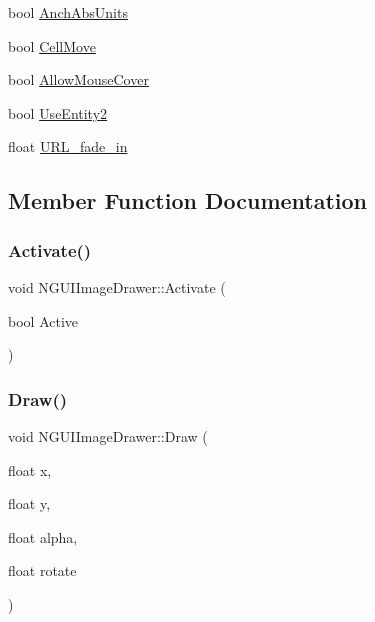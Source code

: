 \begin{DoxyCompactItemize}
\item 
bool \hyperlink{class_n_g_u_i_image_drawer_aea633e92d6a01baf10814c6df5df44a7}{Anch\+Abs\+Units}
\item 
bool \hyperlink{class_n_g_u_i_image_drawer_aea0b2a0cd78dc240891865766200958b}{Cell\+Move}
\item 
bool \hyperlink{class_n_g_u_i_image_drawer_a9c3f848a9c73894fa805b0617738085d}{Allow\+Mouse\+Cover}
\item 
bool \hyperlink{class_n_g_u_i_image_drawer_abe4dc9a015ba702beac15192dbccb3b3}{Use\+Entity2}
\item 
float \hyperlink{class_n_g_u_i_image_drawer_abed20e29d165cf6672c4034963d0b6eb}{U\+R\+L\+\_\+fade\+\_\+in}
\end{DoxyCompactItemize}


\subsection{Member Function Documentation}
\hypertarget{class_n_g_u_i_image_drawer_afa6cb812851c3d2aa7516c0ce47de933}{}\label{class_n_g_u_i_image_drawer_afa6cb812851c3d2aa7516c0ce47de933} 
\subsubsection{\texorpdfstring{Activate()}{Activate()}}
{\footnotesize\ttfamily void N\+G\+U\+I\+Image\+Drawer\+::\+Activate (\begin{DoxyParamCaption}\item[{bool}]{Active }\end{DoxyParamCaption})}

\hypertarget{class_n_g_u_i_image_drawer_ab57ab2720311a3a942dd789c17ab64e9}{}\label{class_n_g_u_i_image_drawer_ab57ab2720311a3a942dd789c17ab64e9} 
\subsubsection{\texorpdfstring{Draw()}{Draw()}\hspace{0.1cm}{\footnotesize\ttfamily [1/2]}}
{\footnotesize\ttfamily void N\+G\+U\+I\+Image\+Drawer\+::\+Draw (\begin{DoxyParamCaption}\item[{float}]{x,  }\item[{float}]{y,  }\item[{float}]{alpha,  }\item[{float}]{rotate }\end{DoxyParamCaption})}

